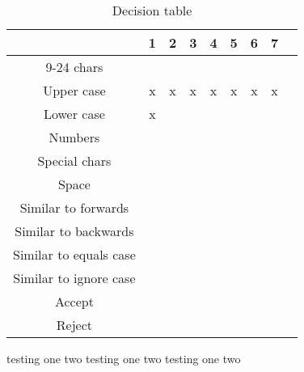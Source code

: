 \documentclass[12pt,letterpaper]{article}
\begin{document}
\begin{table}[h]
  \begin{center}
    \caption{Decision table}
    \label{tab:Main table}
    
    \begin{tabular}{c|c|c|c|c|c|c|c|c}
    & 1 & 2 & 3 & 4 & 5 & 6 & 7 & \\
    \hline
    9-24 chars & & & & & & & \\
    \hline
    Upper case & x & x & x & x & x & x & x \\
    \hline
    Lower case & x & & & & & & \\
    \hline
    Numbers & & & & & & & \\
    \hline
    Special chars & & & & & & & \\
    \hline
    Space & & & & & & & \\
    \hline
    Similar to forwards & & & & & & & \\
    \hline
    Similar to backwards & & & & & & & \\
    \hline
    Similar to equals case & & & & & & & \\
    \hline
    Similar to ignore case & & & & & & & \\
    \midrule
    Accept & & & & & & & \\
    \hline
    Reject & & & & & & & \\
    \end{tabular}
  \end{center}
\end{table}

testing one two
testing one two
testing one two
\end{document}
